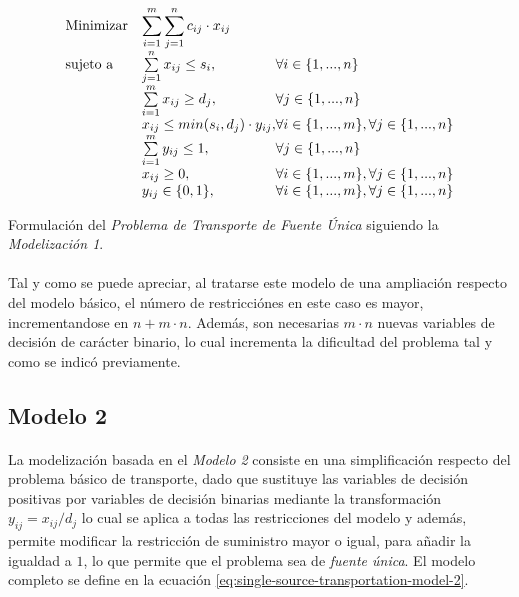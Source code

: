 \documentclass[a4paper, spanish]{article}
\begin{document}
      \begin{eqfloat}
        \begin{equation}
          \begin{array}{ll@{}ll}
            \text{Minimizar}	& \displaystyle \sum\limits_{i=1}^{m}\sum\limits_{j=1}^{n}c_{ij} \cdot x_{ij} \\
            \text{sujeto a}		& \sum\limits_{j=1}^{n} x_{ij}	\leq s_{i}, & \forall i \in \{1,...,n\}\\
                              &	\sum\limits_{i=1}^{m} x_{ij}	\geq d_{j}, & \forall j \in \{1,...,n\} \\
                              & x_{ij}	\leq min(s_{i}, d_{j}) \cdot y_{ij}, 	& \forall i \in \{1,...,m\}, \forall j \in \{1,...,n\} \\
                              &	\sum\limits_{i=1}^{m} y_{ij}	\leq 1, & \forall j \in \{1,...,n\} \\
                              & x_{ij}	\geq 0, 	& \forall i \in \{1,...,m\}, \forall j \in \{1,...,n\} \\
                              & y_{ij}	\in \{0, 1\}, 	& \forall i \in \{1,...,m\}, \forall j \in \{1,...,n\} \\
          \end{array}
        \end{equation}
        \caption{Formulación del \emph{Problema de Transporte de Fuente Única} siguiendo la \emph{Modelización 1}.}
        \label{eq:single-source-transportation-model-1}
      \end{eqfloat}

      \paragraph{}
      Tal y como se puede apreciar, al tratarse este modelo de una ampliación respecto del modelo básico, el número de restricciónes en este caso es mayor, incrementandose en $n + m \cdot n$. Además, son necesarias $m \cdot n$ nuevas variables de decisión de carácter binario, lo cual incrementa la dificultad del problema tal y como se indicó previamente.

    \subsection{Modelo 2}
    \label{sec:approach-2}

      \paragraph{}
      La modelización basada en el \emph{Modelo 2} consiste en una simplificación respecto del problema básico de transporte, dado que sustituye las variables de decisión positivas por variables de decisión binarias mediante la transformación $y_{ij} = x_{ij} / d_j$ lo cual se aplica a todas las restricciones del modelo y además, permite modificar la restricción de suministro mayor o igual, para añadir la igualdad a $1$, lo que permite que el problema sea de \emph{fuente única}. El modelo completo se define en la ecuación \eqref{eq:single-source-transportation-model-2}.
\end{document}
